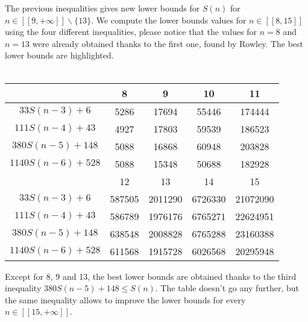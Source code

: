 The previous inequalities gives new lower bounds for \(S(n)\) for
\( n \in [\![9,+\infty]\!] \backslash \{13\} \). We compute the lower
bounds values for \( n \in [\![8,15]\!] \) using the four different inequalities, please notice that the values for \( n = 8\) and \(n = 13\) were already obtained thanks to the first one, found by Rowley. The best lower bounds are highlighted.\\
\\
\begin{center}
\begin{tabular}{|*{5}{c|}}
    \hline
	 & 8 & 9 & 10 & 11 \\
	\hline
	\(33S(n-3) + 6 \) & \cellcolor{yellow} 5286 & 17694 & 55446 & 174444\\
	\hline
	\(111S(n-4) + 43 \) & 4927 & \cellcolor{yellow} 17803 & 59539 & 186523\\
	\hline
	\(380S(n-5) + 148 \) & 5088 & 16868 & \cellcolor{yellow} 60948 & \cellcolor{yellow} 203828 \\
	\hline
	\(1140S(n-6) + 528 \) & 5088 & 15348 & 50688 & 182928\\
	\hline
	\hline
	& 12 & 13 & 14 & 15 \\
	\hline
	\(33S(n-3) + 6 \) & 587505 & \cellcolor{yellow} 2011290 & 6726330 & 21072090\\
	\hline
	\(111S(n-4) + 43 \) & 586789 & 1976176 & 6765271 & 22624951 \\
	\hline
	\(380S(n-5) + 148 \) & \cellcolor{yellow} 638548 & 2008828 & \cellcolor{yellow} 6765288 & \cellcolor{yellow} 23160388 \\
	\hline
	\(1140S(n-6) + 528 \) & 611568 & 1915728 & 6026568 & 20295948 \\
	\hline
\end{tabular}
\end{center}
Except for 8, 9 and 13, the best lower bounds are obtained thanks to the third inequality \( 380S(n-5) + 148 \leqslant S(n) \). The table doesn't go any further, but the same inequality allows to improve the lower bounds for every \( n \in [\![15,+\infty]\!] \).
